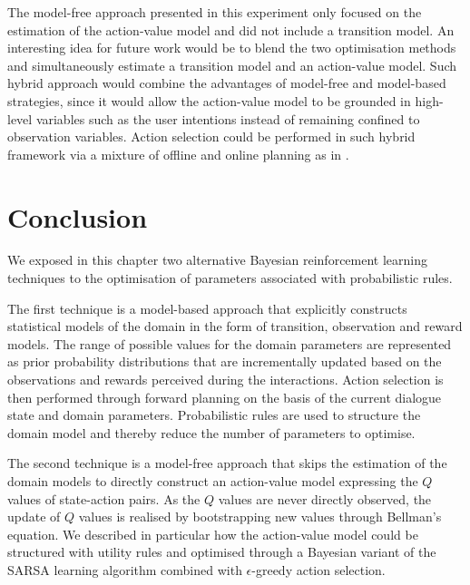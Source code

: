 The model-free approach presented in this experiment only focused on the estimation of the action-value model and did not include a transition model.  An interesting idea for future work would be to blend the two optimisation methods and simultaneously estimate a transition model and an action-value model.  Such hybrid approach would combine the advantages of model-free and model-based strategies, since it would allow the action-value model to be grounded in high-level variables such as the user intentions instead of remaining confined to observation variables. Action selection could be performed in such hybrid framework via a mixture of offline and online planning as in \cite{RossC07}. 

\section{Conclusion}


We exposed in this chapter two alternative Bayesian reinforcement learning techniques to the optimisation of parameters associated with probabilistic rules.

The first technique is a model-based approach that explicitly constructs statistical models of the domain in the form of transition, observation and reward models.  The range of possible values for the domain parameters are represented as prior probability distributions that are incrementally updated based on the observations and rewards perceived during the interactions. Action selection is then performed through forward planning on the basis of the current dialogue state and domain parameters. Probabilistic rules are used to structure the domain model and thereby reduce the number of parameters to optimise.

The second technique is a model-free approach that skips the estimation of the domain models to directly construct an action-value model expressing the $Q$ values of state-action pairs.  As the $Q$ values are never directly observed, the update of $Q$ values is realised by bootstrapping new values through Bellman's equation. We described in particular how the action-value model could be structured with utility rules and optimised through a Bayesian variant of the SARSA learning algorithm combined with $\epsilon$-greedy action selection. 

